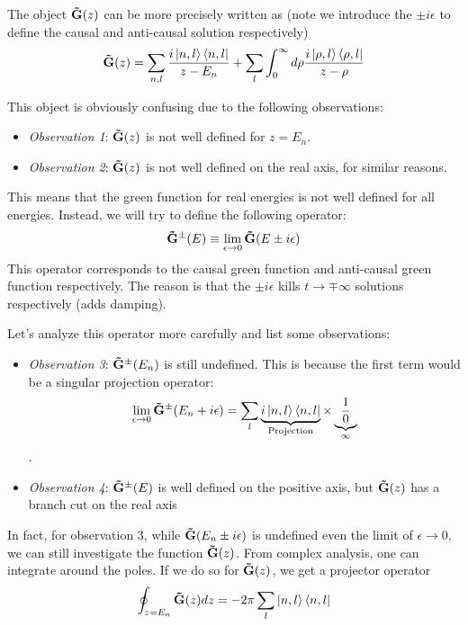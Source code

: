 \documentclass[11pt]{article}
\theoremstyle{definition}
\begin{document}
The object $\mathbf{\tilde{G}} (z)$ can be more precisely written as (note we introduce the $\pm i \epsilon$ to define the causal and anti-causal solution respectively)
\begin{align}
\mathbf{\tilde{G}}(z) = \sum_{n, l} {i \ket{n, l} \bra{n, l} \over z - E_n} + \sum_l \int_{0}^\infty d\rho {i \ket{\rho, l} \bra{\rho, l} \over z - \rho}
\end{align}

This object is obviously confusing due to the following observations:
\begin{itemize}
\item \emph{Observation 1}: $\mathbf{\tilde{G}}(z)$ is not well defined for $z = E_n$.  
\item \emph{Observation 2}: $\mathbf{\tilde{G}}(z)$ is not well defined on the real axis, for similar reasons.
\end{itemize}

This means that the green function for real energies is not well defined for all energies.  Instead, we will try to define the following operator:
\begin{align}
\mathbf{\tilde{G}}^\pm(E) \equiv \lim_{\epsilon \rightarrow 0} \mathbf{\tilde{G}}(E \pm i \epsilon)
\end{align}
This operator corresponds to the causal green function and anti-causal green function respectively.  The reason is that the $\pm i \epsilon$ kills $ t \rightarrow \mp \infty$ solutions respectively (adds damping).
 
Let's analyze this operator more carefully and list some observations:
\begin{itemize}
\item \emph{Observation 3}: $\mathbf{\tilde{G}}^\pm(E_n)$ is still undefined.  This is because the first term would be a singular projection operator:
$$\lim_{\epsilon \rightarrow 0}\mathbf{\tilde{G}}^\pm(E_n + i \epsilon) = \sum_l \underbrace{{i \ket{n, l} \bra{n, l}}}_{\text{Projection}} \times \underbrace{{1 \over 0}}_{\infty}$$.
\item \emph{Observation 4}: $\mathbf{\tilde{G}}^\pm(E)$ is well defined on the positive axis, but $\mathbf{\tilde{G}}(z)$ has a branch cut on the real axis
\end{itemize}

In fact, for observation 3, while $\mathbf{\tilde{G}}(E_n \pm i \epsilon)$ is undefined even the limit of $\epsilon \rightarrow 0$, we can still investigate the function $\mathbf{\tilde{G}}(z)$.  From complex analysis, one can integrate around the poles.  If we do so for $\mathbf{\tilde{G}}(z)$, we get a projector operator
$$\oint_{z = E_n} \mathbf{\tilde{G}}(z) {dz} =  -2 \pi \sum_{l} \ket{n, l} \bra{n, l}$$
\end{document}
